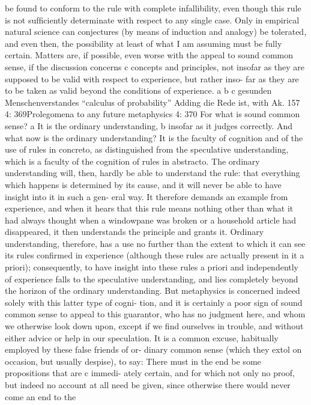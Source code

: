 be found to conform to the rule with complete infallibility, even though
this rule is not sufﬁciently determinate with respect to any single case.
Only in empirical natural science can conjectures (by means of induction
and analogy) be tolerated, and even then, the possibility at least of what
I am assuming must be fully certain.
Matters are, if possible, even worse with the appeal to sound common
sense, if the discussion concerns c concepts and principles, not insofar as
they are supposed to be valid with respect to experience, but rather inso-
far as they are to be taken as valid beyond the conditions of experience.
a
b
c
gesunden Menschenverstandes
“calculus of probability”
Adding die Rede ist, with Ak.
157
4: 369Prolegomena to any future metaphysics
4: 370
For what is sound common sense? a It is the ordinary understanding, b insofar
as it judges correctly. And what now is the ordinary understanding? It is
the faculty of cognition and of the use of rules in concreto, as distinguished
from the speculative understanding, which is a faculty of the cognition of
rules in abstracto. The ordinary understanding will, then, hardly be able
to understand the rule: that everything which happens is determined by
its cause, and it will never be able to have insight into it in such a gen-
eral way. It therefore demands an example from experience, and when it
hears that this rule means nothing other than what it had always thought
when a windowpane was broken or a household article had disappeared,
it then understands the principle and grants it. Ordinary understanding,
therefore, has a use no further than the extent to which it can see its
rules conﬁrmed in experience (although these rules are actually present
in it a priori); consequently, to have insight into these rules a priori and
independently of experience falls to the speculative understanding, and
lies completely beyond the horizon of the ordinary understanding. But
metaphysics is concerned indeed solely with this latter type of cogni-
tion, and it is certainly a poor sign of sound common sense to appeal to
this guarantor, who has no judgment here, and whom we otherwise look
down upon, except if we ﬁnd ourselves in trouble, and without either
advice or help in our speculation.
It is a common excuse, habitually employed by these false friends of or-
dinary common sense (which they extol on occasion, but usually despise),
to say: There must in the end be some propositions that are c immedi-
ately certain, and for which not only no proof, but indeed no account at
all need be given, since otherwise there would never come an end to the
